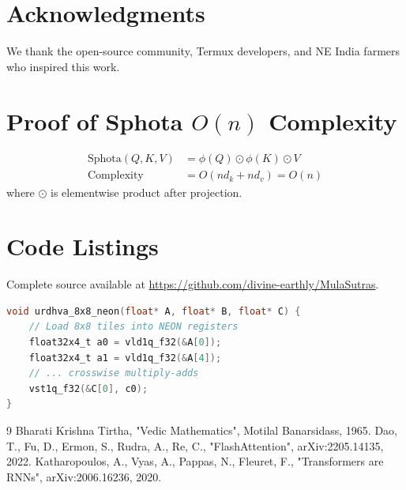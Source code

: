 \documentclass[12pt, a4paper]{article}
\begin{document}
\section*{Acknowledgments}
We thank the open-source community, Termux developers, and NE India farmers who inspired this work.

\appendix
\section{Proof of Sphota $O(n)$ Complexity}
\begin{align*}
\text{Sphota}(Q,K,V) &= \phi(Q) \odot \phi(K) \odot V \\
\text{Complexity} &= O(n d_k + n d_v) = O(n)
\end{align*}
where $\odot$ is elementwise product after projection.

\section{Code Listings}
Complete source available at \url{https://github.com/divine-earthly/MulaSutras}.

\begin{lstlisting}[language=C, caption=Urdhva 8x8 NEON Kernel]
void urdhva_8x8_neon(float* A, float* B, float* C) {
    // Load 8x8 tiles into NEON registers
    float32x4_t a0 = vld1q_f32(&A[0]);
    float32x4_t a1 = vld1q_f32(&A[4]);
    // ... crosswise multiply-adds
    vst1q_f32(&C[0], c0);
}
\end{lstlisting}


\begin{thebibliography}{9}
 Bharati Krishna Tirtha, "Vedic Mathematics", Motilal Banarsidass, 1965.
 Dao, T., Fu, D., Ermon, S., Rudra, A., Re, C., "FlashAttention", arXiv:2205.14135, 2022.
 Katharopoulos, A., Vyas, A., Pappas, N., Fleuret, F., "Transformers are RNNs", arXiv:2006.16236, 2020.
\end{thebibliography}
\end{document}
